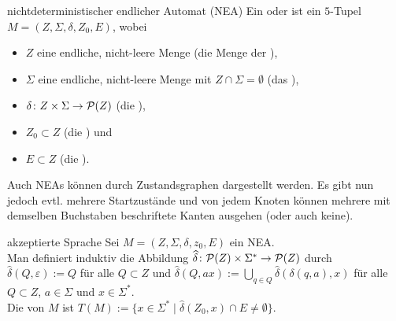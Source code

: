 \begin{Def}{nichtdeterministischer endlicher Automat (NEA)}
    Ein 
    oder  ist ein $5$-Tupel $M = (Z, \Sigma, \delta, Z_0, E)$,
    wobei
    \begin{itemize}
        \item
        $Z$ eine endliche, nicht-leere Menge
        (die Menge der ),
        
        \item
        $\Sigma$ eine endliche, nicht-leere Menge
        mit $Z \cap \Sigma = \emptyset$
        (das ),
        
        \item
        $\delta\colon Z \times \Sigma \rightarrow \P(Z)$
        (die ),
        
        \item
        $Z_0 \subset Z$ (die ) und
        
        \item
        $E \subset Z$ (die ).
    \end{itemize}
\end{Def}

\begin{Bem}
    Auch NEAs können durch Zustandsgraphen dargestellt werden.
    Es gibt nun jedoch evtl. mehrere Startzustände und von jedem Knoten
    können mehrere mit demselben Buchstaben beschriftete Kanten ausgehen
    (oder auch keine).
\end{Bem}

\begin{Def}{akzeptierte Sprache}
    Sei $M = (Z, \Sigma, \delta, z_0, E)$ ein NEA.\\
    Man definiert induktiv die Abbildung
    $\widehat{\delta}\colon \P(Z) \times \Sigma^\ast \rightarrow \P(Z)$ durch
    $\widehat{\delta}(Q, \varepsilon) := Q$ für alle $Q \subset Z$ und
    $\widehat{\delta}(Q, ax) := \bigcup_{q \in Q}
    \widehat{\delta}(\delta(q, a), x)$ für alle
    $Q \subset Z$, $a \in \Sigma$ und $x \in \Sigma^\ast$.\\
    Die von $M$  ist
    $T(M) := \{x \in \Sigma^\ast \;|\;
    \widehat{\delta}(Z_0, x) \cap E \not= \emptyset\}$.
\end{Def}

\linie


